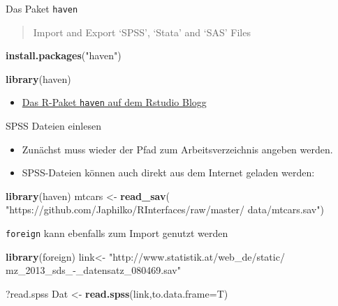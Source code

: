 \documentclass[ignorenonframetext,]{beamer}
\newenvironment{Shaded}{}{}
\newcommand{\KeywordTok}[1]{\textcolor[rgb]{0.00,0.44,0.13}{\textbf{{#1}}}}
\newcommand{\DataTypeTok}[1]{\textcolor[rgb]{0.56,0.13,0.00}{{#1}}}
\newcommand{\StringTok}[1]{\textcolor[rgb]{0.25,0.44,0.63}{{#1}}}
\newcommand{\NormalTok}[1]{{#1}}
\providecommand{\tightlist}{%
\setlength{\itemsep}{0pt}\setlength{\parskip}{0pt}}
\begin{document}
\begin{frame}[fragile]{Das Paket \texttt{haven}}

\begin{quote}
Import and Export `SPSS', `Stata' and `SAS' Files
\end{quote}

\begin{Shaded}
\begin{Highlighting}[]
\KeywordTok{install.packages}\NormalTok{(}\StringTok{"haven"}\NormalTok{)}
\end{Highlighting}
\end{Shaded}

\begin{Shaded}
\begin{Highlighting}[]
\KeywordTok{library}\NormalTok{(haven)}
\end{Highlighting}
\end{Shaded}

\begin{itemize}
\tightlist
\item
  \href{https://blog.rstudio.org/2016/10/04/haven-1-0-0/}{Das R-Paket
  \texttt{haven} auf dem Rstudio Blogg}
\end{itemize}

\end{frame}

\begin{frame}[fragile]{SPSS Dateien einlesen}

\begin{itemize}
\tightlist
\item
  Zunächst muss wieder der Pfad zum Arbeitsverzeichnis angeben werden.
\item
  SPSS-Dateien können auch direkt aus dem Internet geladen werden:
\end{itemize}

\begin{Shaded}
\begin{Highlighting}[]
\KeywordTok{library}\NormalTok{(haven)}
\NormalTok{mtcars <-}\StringTok{ }\KeywordTok{read_sav}\NormalTok{(}
\StringTok{"https://github.com/Japhilko/RInterfaces/raw/master/}
\StringTok{data/mtcars.sav"}\NormalTok{)}
\end{Highlighting}
\end{Shaded}

\end{frame}

\begin{frame}[fragile]{\texttt{foreign} kann ebenfalls zum Import
genutzt werden}

\begin{Shaded}
\begin{Highlighting}[]
\KeywordTok{library}\NormalTok{(foreign)}
\NormalTok{link<-}\StringTok{ "http://www.statistik.at/web_de/static/}
\StringTok{mz_2013_sds_-_datensatz_080469.sav"}

\NormalTok{?read.spss}
\NormalTok{Dat <-}\StringTok{ }\KeywordTok{read.spss}\NormalTok{(link,}\DataTypeTok{to.data.frame=}\NormalTok{T)}
\end{Highlighting}
\end{Shaded}

\end{frame}
\end{document}
